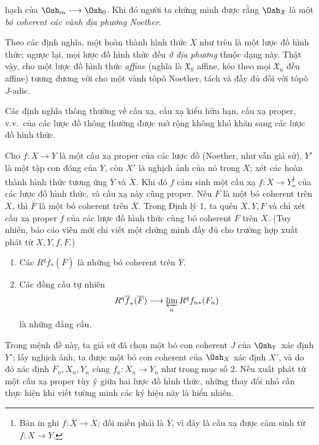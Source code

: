 hạch của $\Osh_m\longrightarrow\Osh_0$. Khi đó người ta chứng minh được rằng
$\Osh_{\mathfrak X}$ là một \emph{bó coherent các vành địa phương Noether}.

Theo các định nghĩa, một hoàn thành hình thức $\overline X$ như trên là một
lược đồ hình thức; ngược lại, mọi lược đồ hình thức đều \emph{ở địa phương}
thuộc dạng này. Thật vậy, cho một lược đồ hình thức \emph{affine} (nghĩa là
$\mathfrak X_0$ affine, kéo theo mọi $\mathfrak X_n$ đều affine) tương đương
với cho một vành tôpô Noether, tách và đầy đủ đối với tôpô $J$-adic.

Các định nghĩa thông thường về cấu xạ, cấu xạ kiểu hữu hạn, cấu xạ proper,
v.v.\ của các lược đồ thông thường được mở rộng không khó khăn sang các lược
đồ hình thức.


Cho $f:X\longrightarrow Y$ là một cấu xạ proper của các lược đồ (Noether, như
vẫn giả sử), $Y'$ là một tập con đóng của $Y$, còn $X'$ là nghịch ảnh của nó
trong $X$; xét các hoàn thành hình thức tương ứng $\overline Y$ và
$\overline X$. Khi đó $f$ cảm sinh một cấu xạ
$\overline f:\overline X\longrightarrow\overline Y$\footnote{Bản in ghi
$\overline f:\overline X\longrightarrow\overline X$; đối miền phải là
$\overline Y$, vì đây là cấu xạ được cảm sinh từ
$f:X\longrightarrow Y$.} của các lược đồ hình thức,
và cấu xạ này cũng proper. Nếu $F$ là một bó coherent trên $X$, thì
$\overline F$ là một bó coherent trên $\overline X$. Trong Định lý 1, ta quên
$X,Y,F$ và chỉ xét cấu xạ proper $\overline f$ của các lược đồ hình thức cùng
bó coherent $\overline F$ trên $\overline X$. (Tuy nhiên, báo cáo viên mới chỉ
viết một chứng minh đầy đủ cho trường hợp xuất phát từ $X,Y,f,F$.)

\begin{enumerate}
  \item[\textit{i.}] Các $R^{q}\overline f_{*}(\overline F)$ là những bó
    coherent trên $\overline Y$.
  \item[\textit{ii.}] Các đồng cấu tự nhiên
    \[
      R^{q}\overline f_{*}(\overline F)
      \longrightarrow \varprojlim_n R^{q}f_{n*}(F_n)
    \]
    là những đẳng cấu.
\end{enumerate}

Trong mệnh đề này, ta giả sử đã chọn một bó con coherent $J$ của $\Osh_Y$ xác
định $Y'$; lấy nghịch ảnh, ta được một bó con coherent của $\Osh_X$ xác định
$X'$, và do đó xác định $F_n,X_n,Y_n$ cùng
$f_n:X_n\longrightarrow Y_n$ như trong mục số 2. Nếu xuất phát từ một cấu xạ
proper tùy ý giữa hai lược đồ hình thức, những thay đổi nhỏ cần thực hiện khi
viết tường minh các ký hiệu này là hiển nhiên.

